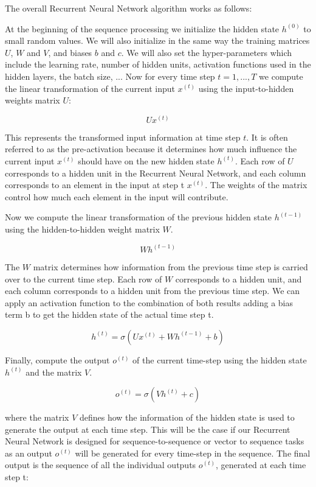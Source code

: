 The overall Recurrent Neural Network algorithm works as follows:

\noindent At the beginning of the sequence processing we initialize the hidden state $h^{(0)}$ to small random values. We will also initialize in the same way the training matrices $U$, $W$ and $V$, and biases $b$ and $c$. We will also set the hyper-parameters which include the learning rate, number of hidden units, activation functions used in the hidden layers, the batch size, ... Now for every time step $ t = 1, ..., T$ we compute the linear transformation of the current input $x^{(t)}$ using the input-to-hidden weights matrix $U$:

$$ U x^{(t)}$$

\noindent This represents the transformed input information at time step $t$. It is often referred to as the pre-activation because it determines how much influence the current input $x^{(t)}$ should have on the new hidden state $h^{(t)}$. Each row of $U$ corresponds to a hidden unit in the Recurrent Neural Network, and each column corresponds to an element in the input at step t $x^{(t)}$. The weights of the matrix control how much each element in the input will contribute.

\noindent Now we compute the linear transformation of the previous hidden state $h^{(t - 1)}$ using the hidden-to-hidden weight matrix $W$.

$$ W h^{(t-1)} $$

\noindent The $W$ matrix determines how information from the previous time step is carried over to the current time step. Each row of $W$ corresponds to a hidden unit, and each column corresponds to a hidden unit from the previous time step.
We can apply an activation function to the combination of both results adding a bias term b to get the hidden state of the actual time step t.

$$ h^{(t)} = \sigma \left( U x^{(t)} + W h^{(t-1)} + b \right) $$

\noindent Finally, compute the output $o^{(t)}$ of the current time-step using the hidden state $h^{(t)}$ and the matrix $V$.

$$ o^{(t)} = \sigma \left(V h^{(t)} + c \right) $$

where the matrix $V$ defines how the information of the hidden state is used to generate the output at each time step. This will be the case if our Recurrent Neural Network is designed for sequence-to-sequence or vector to sequence tasks as an output $o^{(t)}$ will be generated for every time-step in the sequence. The final output is the sequence of all the individual outputs $o^{(t)}$, generated at each time step t:

